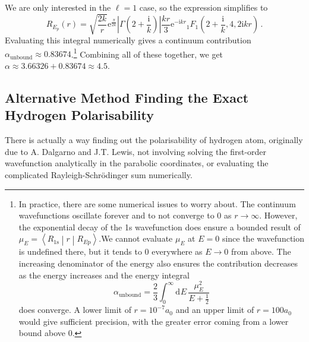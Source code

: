 \documentclass{article}
\theoremstyle{plain}\theoremheaderfont{\normalfont\itshape}\theorembodyfont{\rmfamily}\theoremseparator{.}\newtheorem*{rem}{Remark}\newtheorem*{ex}{Example}\newtheorem*{proof}{Proof}\newtheorem*{altp}{Alternative proof}
\theoremstyle{plain}\theoremheaderfont{\normalfont\bfseries}\theorembodyfont{\rmfamily}\theoremseparator{.}\newtheorem{thm}{Theorem}[section]\newtheorem{lem}[thm]{Lemma}\newtheorem{prop}[thm]{Proposition}\newtheorem*{cor}{Corollary}\newtheorem{defn}[thm]{Definition}\newtheorem{clm}[thm]{Claim}\newtheorem{clminproof}{Claim}
\theoremstyle{break}\theoremheaderfont{\normalfont\itshape}\theorembodyfont{\rmfamily}\theoremseparator{.\medskip}\newtheorem*{proofskip}{Proof}\newtheorem*{exs}{Examples}\newtheorem*{rems}{Remarks}
\theoremstyle{break}\theoremheaderfont{\normalfont\bfseries}\theorembodyfont{\rmfamily}\theoremseparator{.\medskip}\newtheorem{lemskip}[thm]{Lemma}\newtheorem{defnskip}[thm]{Definition}\newtheorem{propskip}[thm]{Proposition}\newtheorem{thmskip}[thm]{Theorem}
\numberwithin{equation}{section}
\newcommand{\ii}{\mathrm{i}}
\newcommand{\ee}{\mathrm{e}}
\newcommand{\dd}[2][]{\mathrm{d}^{#1} #2\,}
\newcommand{\mel}[3]{\left\langle #1 \middle| #2 \middle| #3 \right\rangle}
\newcommand{\abs}[1]{\left| #1 \right|}
\begin{document}
    We are only interested in the \(\ell=1\) case, so the expression simplifies to
    \begin{equation}
        R_{E_p}(r)=\sqrt{\frac{2k}{r}}\ee^{\frac{\pi}{2k}}\abs{\Gamma\left(2+\frac{\ii}{k}\right)}\frac{kr}{3}\ee^{-\ii kr}{_1F_1}\left(2+\frac{\ii}{k},4,2\ii kr\right)\,.
    \end{equation}
    Evaluating this integral numerically gives a continuum contribution \(\alpha_{\text{unbound}}\approx 0.83674\).\footnote{In practice, there are some numerical issues to worry about. The continuum wavefunctions oscillate forever and to not converge to \(0\) as \(r\to\infty\). However, the exponential decay of the 1s wavefunction does ensure a bounded result of \(\mu_E=\mel{R_{1\mathrm{s}}}{r}{R_{E\mathrm{p}}}\).We cannot evaluate \(\mu_E\) at \(E=0\) since the wavefunction is undefined there, but it tends to 0 everywhere as \(E\to 0\) from above. The increasing denominator of the energy also ensures the contribution decreases as the energy increases and the energy integral
    \begin{equation}
        \alpha_{\text{unbound}}=\frac{2}{3}\int_{0}^{\infty}\dd{E}\frac{\mu_E^2}{E+\frac{1}{2}}
    \end{equation}
    does converge. A lower limit of \(r=10^{-7}a_0\) and an upper limit of \(r=100 a_0\) would give sufficient precision, with the greater error coming from a lower bound above \(0\).} Combining all of these together, we get \(\alpha\approx 3.66326+0.83674\approx 4.5\).

    \subsection{Alternative Method Finding the Exact Hydrogen Polarisability}

    There is actually a way finding out the polarisability of hydrogen atom, originally due to A. Dalgarno and J.T. Lewis, not involving solving the first-order wavefunction analytically in the parabolic coordinates, or evaluating the complicated Rayleigh-Schr\"{o}dinger sum numerically.
\end{document}
